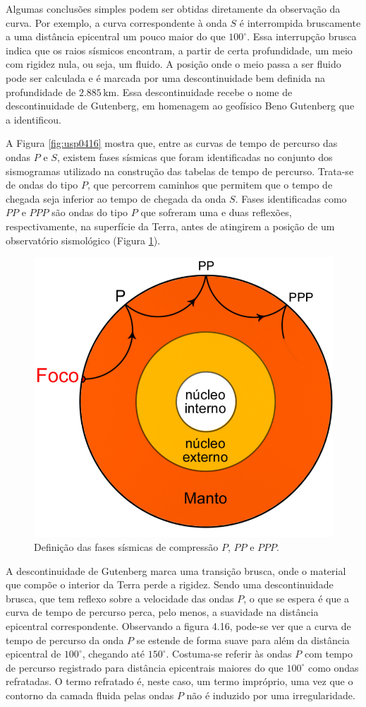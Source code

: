 \documentclass[]{book}
\theoremstyle{definition}
\theoremstyle{definition}
\theoremstyle{definition}
\theoremstyle{remark}
\begin{document}
Algumas conclusões simples podem ser obtidas diretamente da observação da curva. Por exemplo, a curva correspondente à onda \(S\) é interrompida bruscamente a uma distância epicentral um pouco maior do que \(100^\circ\). Essa interrupção brusca indica que os raios sísmicos encontram, a partir de certa profundidade, um meio com rigidez nula, ou seja, um fluido. A posição onde o meio passa a ser fluido pode ser calculada e é marcada por uma descontinuidade bem definida na profundidade de \(2.885\,\mathrm{km}\). Essa descontinuidade recebe o nome de descontinuidade de Gutenberg, em homenagem ao geofísico Beno Gutenberg que a identificou.

A Figura \ref{fig:usp0416} mostra que, entre as curvas de tempo de percurso das ondas \(P\) e \(S\), existem fases sísmicas que foram identificadas no conjunto dos sismogramas utilizado na construção das tabelas de tempo de percurso. Trata-se de ondas do tipo \(P\), que percorrem caminhos que permitem que o tempo de chegada seja inferior ao tempo de chegada da onda \(S\). Fases identificadas como \(PP\) e \(PPP\) são ondas do tipo \(P\) que sofreram uma e duas reflexões, respectivamente, na superfície da Terra, antes de atingirem a posição de um observatório sismológico (Figura \ref{fig:usp0417}).

\begin{figure}

{\centering \includegraphics[width=0.5\linewidth]{fig/figU17} 

}

\caption{Definição das fases sísmicas de compressão $P$, $PP$ e $PPP$.}\label{fig:usp0417}
\end{figure}

A descontinuidade de Gutenberg marca uma transição brusca, onde o material que compõe o interior da Terra perde a rigidez. Sendo uma descontinuidade brusca, que tem reflexo sobre a velocidade das ondas \(P\), o que se espera é que a curva de tempo de percurso perca, pelo menos, a suavidade na distância epicentral correspondente. Observando a figura 4.16, pode-se ver que a curva de tempo de percurso da onda \(P\) se estende de forma suave para além da distância epicentral de \(100^\circ\), chegando até \(150^\circ\). Costuma-se referir às ondas \(P\) com tempo de percurso registrado para distância epicentrais maiores do que \(100^\circ\) como ondas refratadas. O termo refratado é, neste caso, um termo impróprio, uma vez que o contorno da camada fluida pelas ondas \(P\) não é induzido por uma irregularidade.
\end{document}

